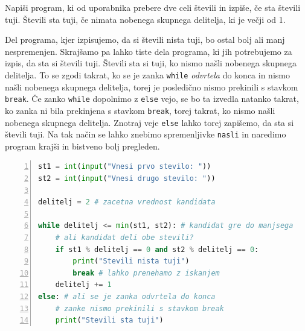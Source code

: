 \begin{zgled}
Napiši program, ki od uporabnika prebere dve celi števili in izpiše, če sta števili tuji. Števili sta tuji, če nimata nobenega skupnega delitelja, ki je večji od 1.
\end{zgled}
\begin{resitev}
Del programa, kjer izpisujemo, da si števili nista tuji, bo ostal bolj ali manj nespremenjen. Skrajšamo pa lahko tiste dela programa, ki jih potrebujemo za izpis, da sta si števili tuji. Števili sta si tuji, ko nismo našli nobenega skupnega delitelja. To se zgodi takrat, ko se je zanka \texttt{while} \emph{odvrtela} do konca in nismo našli nobenega skupnega delitelja, torej je posledično nismo prekinili s stavkom \texttt{break}. Če zanko \texttt{while} dopolnimo z \texttt{else} vejo, se bo ta izvedla natanko takrat, ko zanka ni bila prekinjena s stavkom \texttt{break}, torej takrat, ko nismo našli nobenega skupnega delitelja. Znotraj veje \texttt{else} lahko torej zapišemo, da sta si števili tuji. Na tak način se lahko znebimo spremenljivke \texttt{nasli} in naredimo program krajši in bistveno bolj pregleden.
\begin{lstlisting}[language=Python,numbers=left]
st1 = int(input("Vnesi prvo stevilo: "))
st2 = int(input("Vnesi drugo stevilo: "))

delitelj = 2 # zacetna vrednost kandidata

while delitelj <= min(st1, st2): # kandidat gre do manjsega
    # ali kandidat deli obe stevili?
    if st1 % delitelj == 0 and st2 % delitelj == 0:
        print("Stevili nista tuji")
        break # lahko prenehamo z iskanjem
    delitelj += 1 
else: # ali se je zanka odvrtela do konca
    # zanke nismo prekinili s stavkom break
    print("Stevili sta tuji")
\end{lstlisting}
\end{resitev}